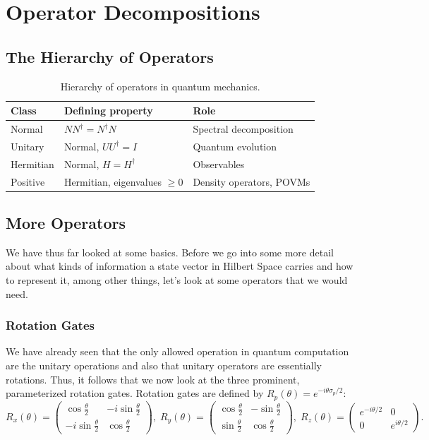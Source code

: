 \documentclass[12pt, a4paper, oneside]{report}
\theoremstyle{plain}
\theoremstyle{definition}
\theoremstyle{remark}
\newcommand{\Rx}{R_x}
\newcommand{\Ry}{R_y}
\newcommand{\Rz}{R_z}
\begin{document}
\chapter{Operator Decompositions}
\section{The Hierarchy of Operators}

\begin{table}[h]
	\centering
	\caption{Hierarchy of operators in quantum mechanics.}
	\label{tab:operators}
	\begin{tabular}{lll}
		\toprule
		\textbf{Class} & \textbf{Defining property}      & \textbf{Role}            \\
		\midrule
		Normal         & $NN^\dagger = N^\dagger N$      & Spectral decomposition   \\
		Unitary        & Normal, $UU^\dagger = I$        & Quantum evolution        \\
		Hermitian      & Normal, $H = H^\dagger$         & Observables              \\
		Positive       & Hermitian, eigenvalues $\geq 0$ & Density operators, POVMs \\
		\bottomrule
	\end{tabular}
\end{table}

\section{More Operators}

We have thus far looked at some basics. Before we go into some more detail about what kinds of information a state vector in Hilbert Space carries and how to represent it, among other things, let's look at some operators that we would need.

\subsection{Rotation Gates}
We have already seen that the only allowed operation in quantum computation are the unitary operations and also that unitary operators are essentially rotations. Thus, it follows that we now look at the three prominent, parameterized rotation gates.
Rotation gates are defined by $R_p(\theta) = e^{-i\theta\sigma_p/2}$:
\[
	\Rx(\theta) = \begin{pmatrix}\cos\frac{\theta}{2}   & -i\sin\frac{\theta}{2} \\
               -i\sin\frac{\theta}{2} & \cos\frac{\theta}{2}\end{pmatrix},\;
	\Ry(\theta) = \begin{pmatrix}\cos\frac{\theta}{2} & -\sin\frac{\theta}{2} \\
               \sin\frac{\theta}{2} & \cos\frac{\theta}{2}\end{pmatrix},\;
	\Rz(\theta) = \begin{pmatrix}e^{-i\theta/2} & 0\\ 0 & e^{i\theta/2}\end{pmatrix}.
\]
\end{document}
